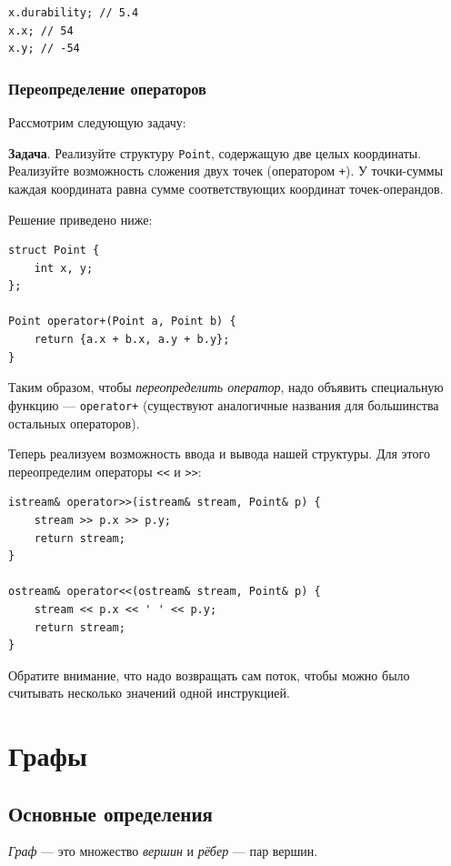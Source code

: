 \documentclass{article}
\newcommand{\task}[1]{\textbf{Задача}. #1}
\begin{document}
	\begin{lstlisting}
x.durability; // 5.4
x.x; // 54
x.y; // -54
	\end{lstlisting}
	
	\subsubsection{Переопределение операторов}
	
	Рассмотрим следующую задачу:
	
	\task{Реализуйте структуру \texttt{Point}, содержащую две целых координаты. Реализуйте возможность сложения двух точек (оператором \texttt{+}). У точки-суммы каждая координата равна сумме соответствующих координат точек-операндов.}
	
	Решение приведено ниже:
	
	\begin{lstlisting}
struct Point {
	int x, y;
};

Point operator+(Point a, Point b) {
	return {a.x + b.x, a.y + b.y};
}
	\end{lstlisting}
	
	Таким образом, чтобы \textit{переопределить оператор}, надо объявить специальную функцию --- \texttt{operator+} (существуют аналогичные названия для большинства остальных операторов).
	
	Теперь реализуем возможность ввода и вывода нашей структуры. Для этого переопределим операторы \texttt{<{}<} и \texttt{>{}>}:
	
	\begin{lstlisting}
istream& operator>>(istream& stream, Point& p) {
	stream >> p.x >> p.y;
	return stream;
}

ostream& operator<<(ostream& stream, Point& p) {
	stream << p.x << ' ' << p.y;
	return stream;
}
	\end{lstlisting}
	
	Обратите внимание, что надо возвращать сам поток, чтобы можно было считывать несколько значений одной инструкцией.
	
	\section{Графы}
	
	\subsection{Основные определения}
	\label{sec:graph-main-def}
	
	\textit{Граф} --- это множество \textit{вершин} и \textit{рёбер} --- пар вершин.
	
\end{document}
